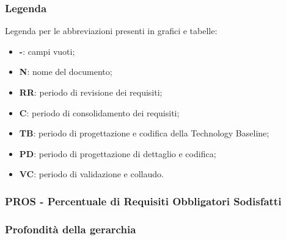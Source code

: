 \subsubsection{Legenda}
Legenda per le abbreviazioni presenti in grafici e tabelle:
\begin{itemize}
	\item \textbf{-}: campi vuoti;
	\item \textbf{N}: nome del documento;
	\item \textbf{RR}: periodo di revisione dei requisiti;
	\item \textbf{C}: periodo di consolidamento dei requisiti;
	\item \textbf{TB}: periodo di progettazione e codifica della Technology Baseline;
	\item \textbf{PD}: periodo di progettazione di dettaglio e codifica;
	\item \textbf{VC}: periodo di validazione e collaudo.
\end{itemize}

\subsubsection{PROS - Percentuale di Requisiti Obbligatori Sodisfatti}

\subsubsection{Profondità della gerarchia}

